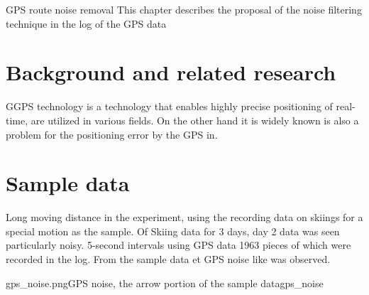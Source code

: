 \chapterhead
{GPS route noise removal}
{This chapter describes the proposal of the noise filtering technique in the log of the GPS data}


\section{Background and related research}
GGPS technology is a technology that enables highly precise positioning of real-time, are utilized in various fields. On the other hand it is widely known is also a problem for the positioning error by the GPS in\cite{gps_wrong}.

\section{Sample data}
Long moving distance in the experiment, using the recording data on skiings for a special motion as the sample. Of Skiing data for 3 days, day 2 data was seen particularly noisy. 5-second intervals using GPS data 1963 pieces of which were recorded in the log.
From the sample data et GPS noise like  was observed.

% 
{gps_noise.png}{GPS noise, the arrow portion of the sample data}{gps_noise}









